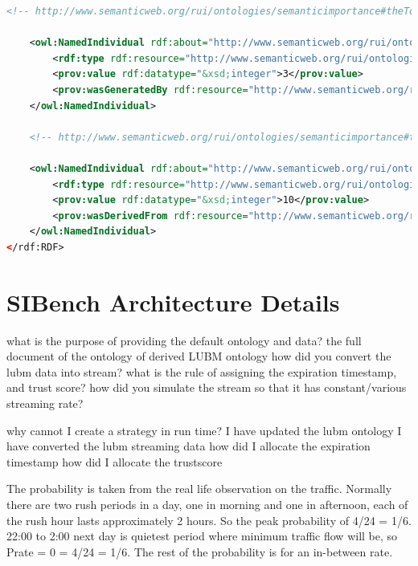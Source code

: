 \begin{lstlisting}[language=XML,caption={Semantic Importance Ontology File (update this file)}]
    <!-- http://www.semanticweb.org/rui/ontologies/semanticimportance#theTotalTimesOfADataItemUsedByQueryEngineForResults -->

    <owl:NamedIndividual rdf:about="http://www.semanticweb.org/rui/ontologies/semanticimportance#theTotalTimesOfADataItemUsedByQueryEngineForResults">
        <rdf:type rdf:resource="http://www.semanticweb.org/rui/ontologies/semanticimportance#QueryParticipationFrequency"/>
        <prov:value rdf:datatype="&xsd;integer">3</prov:value>
        <prov:wasGeneratedBy rdf:resource="http://www.semanticweb.org/rui/ontologies/semanticimportance#aDataItemIsUsedByQueryEngineForResults"/>
    </owl:NamedIndividual>
    
    <!-- http://www.semanticweb.org/rui/ontologies/semanticimportance#trustworthinessInstance -->

    <owl:NamedIndividual rdf:about="http://www.semanticweb.org/rui/ontologies/semanticimportance#trustworthinessInstance">
        <rdf:type rdf:resource="http://www.semanticweb.org/rui/ontologies/semanticimportance#DataTrustWorthiness"/>
        <prov:value rdf:datatype="&xsd;integer">10</prov:value>
        <prov:wasDerivedFrom rdf:resource="http://www.semanticweb.org/rui/ontologies/semanticimportance#aTrustEquation"/>
    </owl:NamedIndividual>
</rdf:RDF>
\end{lstlisting}
%
\chapter{SIBench Architecture Details}
what is the purpose of providing the default ontology and data?
the full document of the ontology of derived LUBM ontology
how did you convert the lubm data into stream? 
what is the rule of assigning the expiration timestamp, and trust score?
how did you simulate the stream so that it has constant/various streaming rate? 

why cannot I create a strategy in run time?
I have updated the lubm ontology
I have converted the lubm streaming data
how did I allocate the expiration timestamp
how did I allocate the trustscore

The probability is taken from the real life observation on the traffic.
Normally there are two rush periods in a day, one in morning and one in afternoon, each of the rush hour lasts approximately 2 hours. 
So the peak probability of 4/24 = 1/6. 
22:00 to 2:00 next day is quietest period where minimum traffic flow will be, so P{rate = 0} = 4/24 = 1/6. 
The rest of the probability is for an in-between rate. 


